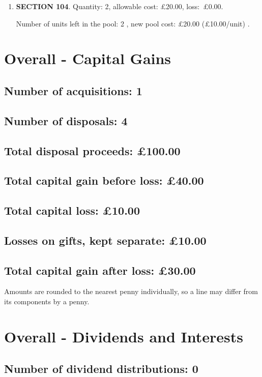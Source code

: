 \documentclass{article}
\begin{document}
\begin{enumerate}
\item \textbf{SECTION 104}. Quantity: 2,
    allowable
    cost:
    £20.00,
    \mbox{loss: £0.00.}

    Number of units left in the pool:
    2%
,
    new pool cost: £20.00
    (£10.00/unit)%
.

\end{enumerate}




\clearpage
\section*{Overall - Capital Gains}
\subsection*{Number of acquisitions: 1}
\subsection*{Number of disposals: 4}
\subsection*{Total disposal proceeds: £100.00}
\subsection*{Total capital gain before loss: £40.00}
\subsection*{Total capital loss: £10.00}
\subsection*{Losses on gifts, kept separate: £10.00}
\subsection*{Total capital gain after loss: £30.00}
\vspace{1em}
Amounts are rounded to the nearest penny individually, so a line may differ from its components by a penny.
\vspace{2em}
\section*{Overall - Dividends and Interests}
\subsection*{Number of dividend distributions: 0}
\end{document}
